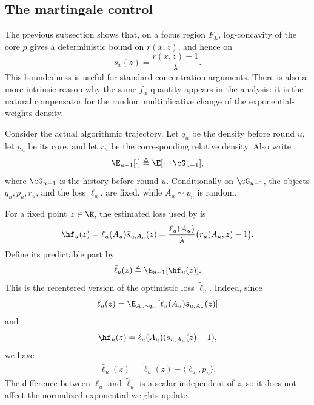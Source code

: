 
\subsection{The martingale control}
\label{sec:martingale_interpretation_f_alpha_budget}

The previous subsection shows that, on a focus region \(F_L\), log-concavity of the core \(p\)
gives a deterministic bound on \(r(x,z)\), and hence on
\[
    \bar{s}_x(z)=\frac{r(x,z)-1}{\lambda}.
\]
This boundedness is useful for standard concentration arguments. There is also a more intrinsic
reason why the same \(f_\alpha\)-quantity appears in the analysis: it is the natural compensator for
the random multiplicative change of the exponential-weights density.

Consider the actual algorithmic trajectory. Let \(q_u\) be the \cewaalg density before round \(u\),
let \(p_u\) be its core, and let \(r_u\) be the corresponding relative density. Also write
\[
    \E_{u-1}[\cdot]
    \triangleq
    \E[\cdot\mid \cG_{u-1}],
\]
where \(\cG_{u-1}\) is the history before round \(u\). Conditionally on \(\cG_{u-1}\), the objects
\(q_u,p_u,r_u\), and the loss \(\ell_u\), are fixed, while \(A_u\sim p_u\) is random.

For a fixed point \(z\in\K\), the estimated loss used by \scewaalg is
\begin{align}
    \hf_u(z)
    =
    \ell_u(A_u)\bar{s}_{u,A_u}(z)
    =
    \frac{\ell_u(A_u)}{\lambda}
    \bigl(r_u(A_u,z)-1\bigr).
    \label{eq:martingale_hf_recentered}
\end{align}
Define its predictable part by
\begin{align}
    \bar{\ell}_u(z)
    \triangleq
    \E_{u-1}[\hf_u(z)].
    \label{eq:bar_ell_predictable_estimator}
\end{align}
This is the recentered version of the optimistic loss \(\tilde{\ell}_u\). Indeed, since
\[
    \tilde{\ell}_u(z)
    =
    \E_{A_u\sim p_u}[\ell_u(A_u)s_{u,A_u}(z)]
\]
and
\[
    \hf_u(z)
    =
    \ell_u(A_u)(s_{u,A_u}(z)-1),
\]
we have
\begin{align}
    \bar{\ell}_u(z)
    =
    \tilde{\ell}_u(z)-\langle \ell_u,p_u\rangle .
    \label{eq:bar_ell_tilde_ell_relation}
\end{align}
The difference between \(\bar{\ell}_u\) and \(\tilde{\ell}_u\) is a scalar independent of \(z\), so it
does not affect the normalized exponential-weights update.

